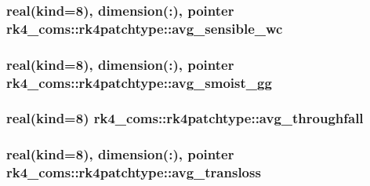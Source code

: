 \subsubsection[{\texorpdfstring{avg\+\_\+sensible\+\_\+wc}{avg_sensible_wc}}]{\setlength{\rightskip}{0pt plus 5cm}real(kind=8), dimension(\+:), pointer rk4\+\_\+coms\+::rk4patchtype\+::avg\+\_\+sensible\+\_\+wc}\hypertarget{structrk4__coms_1_1rk4patchtype_a7b82112214dee9a3c72043a024acb538}{}\label{structrk4__coms_1_1rk4patchtype_a7b82112214dee9a3c72043a024acb538}
\subsubsection[{\texorpdfstring{avg\+\_\+smoist\+\_\+gg}{avg_smoist_gg}}]{\setlength{\rightskip}{0pt plus 5cm}real(kind=8), dimension(\+:), pointer rk4\+\_\+coms\+::rk4patchtype\+::avg\+\_\+smoist\+\_\+gg}\hypertarget{structrk4__coms_1_1rk4patchtype_ab560e2cc8ea1d10fdd457fa4a642b84c}{}\label{structrk4__coms_1_1rk4patchtype_ab560e2cc8ea1d10fdd457fa4a642b84c}
\subsubsection[{\texorpdfstring{avg\+\_\+throughfall}{avg_throughfall}}]{\setlength{\rightskip}{0pt plus 5cm}real(kind=8) rk4\+\_\+coms\+::rk4patchtype\+::avg\+\_\+throughfall}\hypertarget{structrk4__coms_1_1rk4patchtype_a0ec74d80afb3b2cd79ab7f574e63b9e2}{}\label{structrk4__coms_1_1rk4patchtype_a0ec74d80afb3b2cd79ab7f574e63b9e2}
\subsubsection[{\texorpdfstring{avg\+\_\+transloss}{avg_transloss}}]{\setlength{\rightskip}{0pt plus 5cm}real(kind=8), dimension(\+:), pointer rk4\+\_\+coms\+::rk4patchtype\+::avg\+\_\+transloss}\hypertarget{structrk4__coms_1_1rk4patchtype_ac216083a0908705ed4765481944cd5fb}{}\label{structrk4__coms_1_1rk4patchtype_ac216083a0908705ed4765481944cd5fb}
